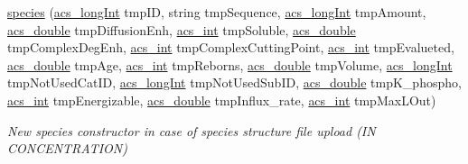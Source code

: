 \begin{DoxyCompactItemize}
\hyperlink{a00022_a9476b35ac9fe80d8cafdda98782eafcf}{species} (\hyperlink{a00050_a19319d75f02db4308bc5c0026d98cd85}{acs\-\_\-long\-Int} tmp\-I\-D, string tmp\-Sequence, \hyperlink{a00050_a19319d75f02db4308bc5c0026d98cd85}{acs\-\_\-long\-Int} tmp\-Amount, \hyperlink{a00050_ab776853a005fcbf56af0424a2a4dd607}{acs\-\_\-double} tmp\-Diffusion\-Enh, \hyperlink{a00050_a8d277355641a098190360234e2ebde35}{acs\-\_\-int} tmp\-Soluble, \hyperlink{a00050_ab776853a005fcbf56af0424a2a4dd607}{acs\-\_\-double} tmp\-Complex\-Deg\-Enh, \hyperlink{a00050_a8d277355641a098190360234e2ebde35}{acs\-\_\-int} tmp\-Complex\-Cutting\-Point, \hyperlink{a00050_a8d277355641a098190360234e2ebde35}{acs\-\_\-int} tmp\-Evalueted, \hyperlink{a00050_ab776853a005fcbf56af0424a2a4dd607}{acs\-\_\-double} tmp\-Age, \hyperlink{a00050_a8d277355641a098190360234e2ebde35}{acs\-\_\-int} tmp\-Reborns, \hyperlink{a00050_ab776853a005fcbf56af0424a2a4dd607}{acs\-\_\-double} tmp\-Volume, \hyperlink{a00050_a19319d75f02db4308bc5c0026d98cd85}{acs\-\_\-long\-Int} tmp\-Not\-Used\-Cat\-I\-D, \hyperlink{a00050_a19319d75f02db4308bc5c0026d98cd85}{acs\-\_\-long\-Int} tmp\-Not\-Used\-Sub\-I\-D, \hyperlink{a00050_ab776853a005fcbf56af0424a2a4dd607}{acs\-\_\-double} tmp\-K\-\_\-phospho, \hyperlink{a00050_a8d277355641a098190360234e2ebde35}{acs\-\_\-int} tmp\-Energizable, \hyperlink{a00050_ab776853a005fcbf56af0424a2a4dd607}{acs\-\_\-double} tmp\-Influx\-\_\-rate, \hyperlink{a00050_a8d277355641a098190360234e2ebde35}{acs\-\_\-int} tmp\-Max\-L\-Out)
\begin{DoxyCompactList}\small\item\em New species constructor in case of species structure file upload (I\-N C\-O\-N\-C\-E\-N\-T\-R\-A\-T\-I\-O\-N) \end{DoxyCompactList}\item 

\end{DoxyCompactItemize}
